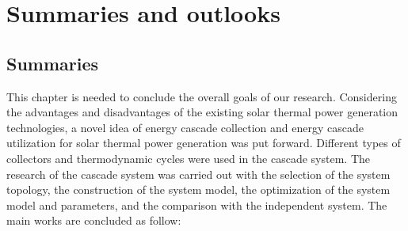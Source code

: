 \chapter{Summaries and outlooks}
\section{Summaries}

This chapter is needed to conclude the overall goals of our research. Considering the advantages and disadvantages of the existing solar thermal power generation technologies, a novel idea of energy cascade collection and energy cascade utilization for solar thermal power generation was put forward. Different types of collectors and thermodynamic cycles were used in the cascade system. The research of the cascade system was carried out with the selection of the system topology, the construction of the system model, the optimization of the system model and parameters, and the comparison with the independent system. The main works are concluded as follow:

